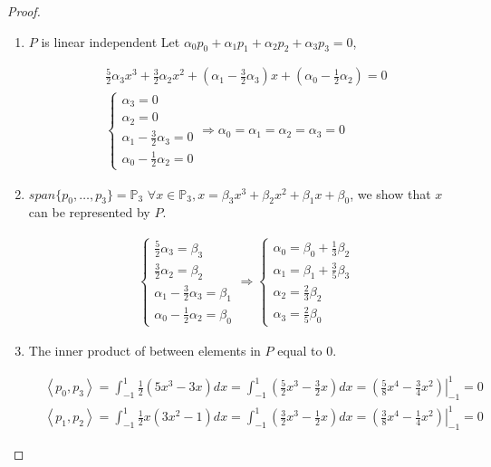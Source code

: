 \documentclass{article}
\theoremstyle{definition} %
\newcommand{\PP}{\mathbb{P}}
\begin{document}
\begin{proof}

\begin{enumerate}[label=(\alph*)]
	\item $P$ is linear independent
	Let $\alpha_0 p_0 + \alpha_1 p_1 + \alpha_2 p_2 + \alpha_3 p_3 = 0$,
	
	\begin{align*}
		\frac{5}{2}\alpha_3 x^3 + \frac{3}{2}\alpha_2 x^2 + (\alpha_1 - \frac{3}{2}\alpha_3) x + (\alpha_0 - \frac{1}{2}\alpha_2) = 0\\
		\left\{
			\begin{array}{llll}
				\alpha_3 = 0\\
				\alpha_2 = 0\\
				\alpha_1 - \frac{3}{2}\alpha_3 = 0\\
				\alpha_0 - \frac{1}{2}\alpha_2 = 0
			\end{array}
		\right. 
		\Rightarrow
		\alpha_0 = \alpha_1 = \alpha_2 = \alpha_3 = 0
	\end{align*}
	
	\item $span\{p_0, \dots, p_3\} = \PP_3$
	$\forall x\in \PP_3, x=\beta_3 x^3 + \beta_2 x^2 + \beta_1 x + \beta_0$, we show that $x$ can be represented by $P$.
	
	\begin{align*}
		\left\{
			\begin{array}{llll}
				\frac{5}{2}\alpha_3 = \beta_3\\
				\frac{3}{2}\alpha_2 = \beta_2\\
				\alpha_1 - \frac{3}{2}\alpha_3 = \beta_1\\
				\alpha_0 - \frac{1}{2}\alpha_2 = \beta_0
			\end{array}
		\right. 
		\Rightarrow
		\left\{
			\begin{array}{llll}
				\alpha_0 = \beta_0 + \frac{1}{3}\beta_2\\
				\alpha_1 = \beta_1 + \frac{3}{5}\beta_3\\
				\alpha_2 = \frac{2}{3}\beta_2\\
				\alpha_3 = \frac{2}{5}\beta_0
			\end{array}
		\right. 
	\end{align*}
	
	\item The inner product of between elements in $P$ equal to 0.

	\begin{align*}
		&\left\langle p_0, p_3\right\rangle=\int_{-1}^1 \frac{1}{2}\left(5 x^3-3 x\right) d x=\int_{-1}^1\left(\frac{5}{2} x^3-\frac{3}{2}x \right)d x=\left.\left(\frac{5}{8} x^4-\frac{3}{4} x^2\right)\right|_{-1}^1=0 \\
		&\left\langle p_1, p_2\right\rangle=\int_{-1}^1 \frac{1}{2} x\left(3 x^2-1\right) d x=\int_{-1}^1\left(\frac{3}{2} x^3-\frac{1}{2} x\right) d x=\left.\left(\frac{3}{8} x^4-\frac{1}{4} x^2\right)\right|_{-1} ^1=0
	\end{align*}
\end{enumerate}

\end{proof}
\end{document}
